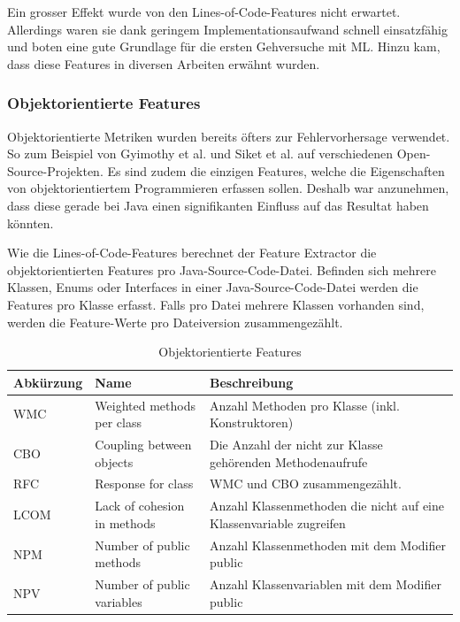 \documentclass[10pt, a4paper]{article}
\begin{document}
Ein grosser Effekt wurde von den Lines-of-Code-Features nicht erwartet. Allerdings waren sie dank geringem Implementationsaufwand schnell einsatzfähig und boten eine gute Grundlage für die ersten Gehversuche mit \ac{ML}. Hinzu kam, dass diese Features in diversen Arbeiten erwähnt wurden.

\subsubsection{Objektorientierte Features} \label{sec:objectorientedfeatures}
Objektorientierte Metriken wurden bereits öfters zur Fehlervorhersage verwendet. So zum Beispiel von Gyimothy et al. \cite{Gyimothy:2005:EVO:1100866.1100985} und Siket et al. \cite{Siket08} auf verschiedenen Open-Source-Projekten. Es sind zudem die einzigen Features, welche die Eigenschaften von objektorientiertem Programmieren erfassen sollen. Deshalb war anzunehmen, dass diese gerade bei Java einen signifikanten Einfluss auf das Resultat haben könnten.

Wie die Lines-of-Code-Features berechnet der Feature Extractor die objektorientierten Features pro Java-Source-Code-Datei. Befinden sich mehrere Klassen, Enums oder Interfaces in einer Java-Source-Code-Datei werden die Features pro Klasse erfasst. Falls pro Datei mehrere Klassen vorhanden sind, werden die Feature-Werte pro Dateiversion zusammengezählt.

\begin{table}[H]
	\begin{tabular}{l|p{3cm}|p{5.75cm}}
		\textbf{Abkürzung} & \textbf{Name} & \textbf{Beschreibung}\\
		\hline
		WMC & Weighted methods per class & Anzahl Methoden pro Klasse (inkl. Konstruktoren)\\
		CBO & Coupling between objects & Die Anzahl der nicht zur Klasse gehörenden Methodenaufrufe\\
		RFC & Response for class & WMC und CBO zusammengezählt.\\
		LCOM & Lack of cohesion in methods & Anzahl Klassenmethoden die nicht auf eine Klassenvariable zugreifen\\
		NPM & Number of public methods & Anzahl Klassenmethoden mit dem Modifier public\\
		NPV & Number of public variables & Anzahl Klassenvariablen mit dem Modifier public\\
	\end{tabular}
	\caption{Objektorientierte Features}
	\label{tab:objectorientedfeatures}
\end{table}
\end{document}
